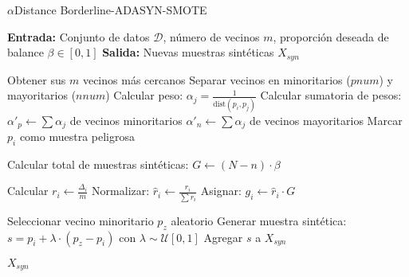 \begin{algorithm}[H]
\caption{$\alpha$Distance Borderline-ADASYN-SMOTE}
\begin{algorithmic}[1]
\State \textbf{Entrada:} Conjunto de datos $\mathcal{D}$, número de vecinos $m$, proporción deseada de balance $\beta \in [0, 1]$
\State \textbf{Salida:} Nuevas muestras sintéticas $X_{syn}$

    \State Obtener sus $m$ vecinos más cercanos
    \State Separar vecinos en minoritarios ($pnum$) y mayoritarios ($nnum$)
        \State Calcular peso: $\alpha_j = \frac{1}{\text{dist}(p_i, p_j)}$
    \EndFor
    \State Calcular sumatoria de pesos:
    \State \hspace{1em} $\alpha'_p \gets \sum \alpha_j$ de vecinos minoritarios
    \State \hspace{1em} $\alpha'_n \gets \sum \alpha_j$ de vecinos mayoritarios
        \State Marcar $p_i$ como muestra peligrosa
    \EndIf
\EndFor

\State Calcular total de muestras sintéticas: $G \gets (N - n) \cdot \beta$

    \State Calcular $r_i \gets \frac{\Delta_i}{m}$
    \State Normalizar: $\hat{r}_i \gets \frac{r_i}{\sum r_i}$
    \State Asignar: $g_i \gets \hat{r}_i \cdot G$
\EndFor

        \State Seleccionar vecino minoritario $p_z$ aleatorio
        \State Generar muestra sintética: $s = p_i + \lambda \cdot (p_z - p_i)$ con $\lambda \sim \mathcal{U}[0, 1]$
        \State Agregar $s$ a $X_{syn}$
    \EndFor
\EndFor

\State \Return $X_{syn}$
\end{algorithmic}
\end{algorithm}
